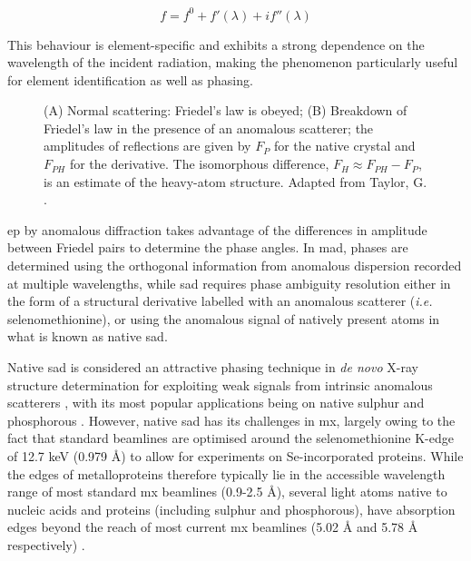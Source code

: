 \begin{equation}
    f=f^0+f'(\lambda)+if''(\lambda) \label{total scattering}
\end{equation}

This behaviour is element-specific and exhibits a strong dependence on the wavelength of the incident radiation, making the phenomenon particularly useful for element identification as well as phasing.

\begin{figure}
    \centering
    
    \caption{(A) Normal scattering: Friedel's law is obeyed; (B) Breakdown of Friedel's law in the presence of an anomalous scatterer; the amplitudes of reflections are given by $F_P$ for the native crystal and $F_{PH}$ for the derivative. The isomorphous difference, $F_H \approx F_{PH} - F_P$, is an estimate of the heavy-atom structure. Adapted from Taylor, G. \cite{Taylor2003}.}
    \label{Breakdown of Friedel's law}
\end{figure}

\ac{ep} by anomalous diffraction takes advantage of the differences in amplitude between Friedel pairs to determine the phase angles. In \ac{mad}, phases are determined using the orthogonal information from anomalous dispersion recorded at multiple wavelengths, while \ac{sad} requires phase ambiguity resolution either in the form of a structural derivative labelled with an anomalous scatterer (\textit{i.e.} selenomethionine), or using the anomalous signal of  natively present atoms in what is known as native \ac{sad}.

Native \ac{sad} is considered an attractive phasing technique in  \textit{de novo} X-ray structure determination %
for exploiting weak signals from intrinsic anomalous scatterers \cite{Basu2019}, with its most popular applications being on native sulphur and phosphorous \cite{Karasawa2022}. However, native \ac{sad} has its challenges in \ac{mx}, largely owing to the fact that standard beamlines are optimised around the selenomethionine K-edge of 12.7 keV (0.979 Å) to allow for experiments on Se-incorporated proteins.
While the edges of metalloproteins therefore typically lie in the accessible wavelength range of most standard \ac{mx} beamlines (0.9-2.5 Å), several light atoms native to nucleic acids and proteins (including sulphur and phosphorous), have absorption edges beyond the reach of most current \ac{mx} beamlines (5.02 Å and 5.78 Å respectively) \cite{Olieric2016}. 

